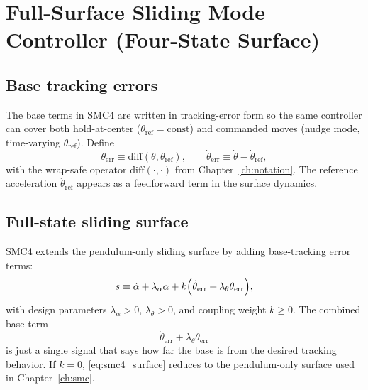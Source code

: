 \chapter{Full-Surface Sliding Mode Controller (Four-State Surface)}
\label{ch:smc4}

\section{Base tracking errors}
The base terms in SMC4 are written in tracking-error form so the same controller can cover both hold-at-center ($\theta_{\mathrm{ref}}=\mathrm{const}$) and commanded moves (nudge mode, time-varying $\theta_{\mathrm{ref}}$). Define
\[
\theta_{\mathrm{err}} \equiv \mathrm{diff}(\theta,\theta_{\mathrm{ref}}),\qquad
\dot{\theta}_{\mathrm{err}} \equiv \dot{\theta}-\dot{\theta}_{\mathrm{ref}},
\]
with the wrap-safe operator $\mathrm{diff}(\cdot,\cdot)$ from Chapter~\ref{ch:notation}. The reference acceleration $\ddot{\theta}_{\mathrm{ref}}$ appears as a feedforward term in the surface dynamics.

\section{Full-state sliding surface}
SMC4 extends the pendulum-only sliding surface by adding base-tracking error terms:
\begin{equation}
s \equiv \dot{\alpha} + \lambda_{\alpha}\alpha
  + k\Bigl(\dot{\theta}_{\mathrm{err}} + \lambda_{\theta}\theta_{\mathrm{err}}\Bigr),
\label{eq:smc4_surface}
\end{equation}
with design parameters $\lambda_{\alpha}>0$, $\lambda_{\theta}>0$, and coupling weight $k\ge 0$. The combined base term
\[
\dot{\theta}_{\mathrm{err}} + \lambda_{\theta}\theta_{\mathrm{err}}
\]
is just a single signal that says how far the base is from the desired tracking behavior. If $k=0$, \eqref{eq:smc4_surface} reduces to the pendulum-only surface used in Chapter~\ref{ch:smc}.

